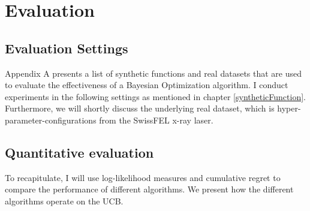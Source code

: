 \chapter{Evaluation}

\ifpdf
    \graphicspath{{07_Chapter6/Figs/Raster/}{07_Chapter6/Figs/PDF/}{07_Chapter6/Figs/}}
\else
    \graphicspath{{07_Chapter6/Figs/Vector/}{07_Chapter6/Figs/}}
\fi

\section{Evaluation Settings}

Appendix A presents a list of synthetic functions and real datasets that are used to evaluate the effectiveness of a Bayesian Optimization algorithm. 
I conduct experiments in the following settings as mentioned in chapter \ref{syntheticFunction}.
Furthermore, we will shortly discuss the underlying real dataset, which is hyper-parameter-configurations from the SwissFEL x-ray laser.

\section{Quantitative evaluation}
To recapitulate, I will use log-likelihood measures and cumulative regret to compare the performance of different algorithms.
We present how the different algorithms operate on the UCB.

